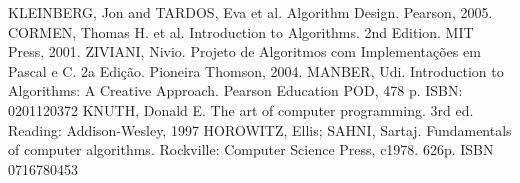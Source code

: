 \small  \begin{minipage}{16cm} \hspace{0,5cm}
\begin{thebibliography}{Szwarcfiter}
 KLEINBERG, Jon and  TARDOS, Eva et al. Algorithm Design. Pearson, 2005.
 CORMEN, Thomas H. et al. Introduction to Algorithms. 2nd Edition. MIT Press, 2001.
 ZIVIANI, Nivio. Projeto de Algoritmos com Implementações em Pascal e C. 2a Edição. Pioneira Thomson, 2004.
 MANBER, Udi. Introduction to Algorithms: A Creative Approach. Pearson Education POD, 478 p. ISBN: 0201120372
 KNUTH, Donald E. The art of computer programming. 3rd ed. Reading: Addison-Wesley, 1997
 HOROWITZ, Ellis; SAHNI, Sartaj. Fundamentals of computer algorithms. Rockville: Computer Science Press, c1978. 626p. ISBN 0716780453
\end{thebibliography}

\end{minipage}
